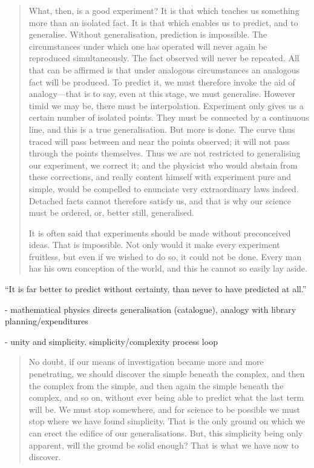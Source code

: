\documentclass{article}
\begin{document}
 
 \begin{quote}
     What, then, is a good experiment?  It is that which teaches us something more than an isolated fact.  It is that which enables us to predict, and to generalise.  Without generalisation, prediction is impossible.  The circumstances under which one has operated will never again be reproduced simultaneously.  The fact observed will never be repeated.  All that can be affirmed is that under analogous circumstances an analogous fact will be produced.  To predict it, we must therefore invoke the aid of analogy---that is to say, even at this stage, we must generalise.  However timid we may be, there must be interpolation.  Experiment only gives us a certain number of isolated points.  They must be connected by a continuous line, and this is a true generalisation.  But more is done.  The curve thus traced will pass between and near the points observed; it will not pass through the points themselves.  Thus we are not restricted to generalising our experiment, we correct it; and the physicist who would abstain from these corrections, and really content himself with experiment pure and simple, would be compelled to enunciate very extraordinary laws indeed.  Detached facts cannot therefore satisfy us, and that is why our science must be ordered, or, better still, generalised.
     
     It is often said that experiments should be made without preconceived ideas.  That is impossible.  Not only would it make every experiment fruitless, but even if we wished to do so, it could not be done.  Every man has his own conception of the world, and this he cannot so easily lay aside.  \citep[p. 142-143]{Poincare1952}
 \end{quote}
 
 ``It is far better to predict without certainty, than never to have predicted at all.'' \citep[p. 144]{Poincare1952}
 
 
 - mathematical physics directs generalisation (catalogue), analogy with library planning/expenditures
 
 - unity and simplicity.  simplicity/complexity process loop
 
 \begin{quote}
     No doubt, if our means of investigation became more and more penetrating, we should discover the simple beneath the complex, and then the complex from the simple, and then again the simple beneath the complex, and so on, without ever being able to predict what the last term will be.  We must stop somewhere, and for science to be possible we must stop where we have found simplicity.  That is the only ground on which we can erect the edifice of our generalisations.  But, this simplicity being only apparent, will the ground be solid enough?  That is what we have now to discover.  \citep[p. 148-149]{Poincare1952}
 \end{quote}
 
\end{document}
